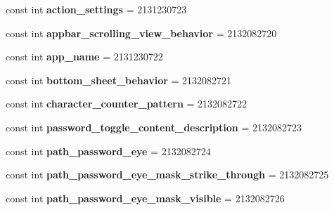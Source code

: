 \begin{DoxyCompactItemize}
const int {\bfseries action\+\_\+settings} = 2131230723
\item 
\mbox{\label{classst_delivery_1_1_resource_1_1_string_a73f4427fdcf138c5f5541f31e81d44af}} 
const int {\bfseries appbar\+\_\+scrolling\+\_\+view\+\_\+behavior} = 2132082720
\item 
\mbox{\label{classst_delivery_1_1_resource_1_1_string_a10df4decdb3e0caa6e07b4a53aa7854d}} 
const int {\bfseries app\+\_\+name} = 2131230722
\item 
\mbox{\label{classst_delivery_1_1_resource_1_1_string_a4cc6f335cbbd3ac409c22aaf3b35bff6}} 
const int {\bfseries bottom\+\_\+sheet\+\_\+behavior} = 2132082721
\item 
\mbox{\label{classst_delivery_1_1_resource_1_1_string_ace87198cd1e907f2593d1e944fc8f258}} 
const int {\bfseries character\+\_\+counter\+\_\+pattern} = 2132082722
\item 
\mbox{\label{classst_delivery_1_1_resource_1_1_string_ad8a3afa0186c3565e08b9b0e0f7b1868}} 
const int {\bfseries password\+\_\+toggle\+\_\+content\+\_\+description} = 2132082723
\item 
\mbox{\label{classst_delivery_1_1_resource_1_1_string_a7491fb216ff4d34fc8372e8d42132615}} 
const int {\bfseries path\+\_\+password\+\_\+eye} = 2132082724
\item 
\mbox{\label{classst_delivery_1_1_resource_1_1_string_a26774a0a2a44ce141c6c2bcba3487168}} 
const int {\bfseries path\+\_\+password\+\_\+eye\+\_\+mask\+\_\+strike\+\_\+through} = 2132082725
\item 
\mbox{\label{classst_delivery_1_1_resource_1_1_string_ae9f104d8ecf6524652921d9e755ab042}} 
const int {\bfseries path\+\_\+password\+\_\+eye\+\_\+mask\+\_\+visible} = 2132082726
\item 
\mbox{\label{classst_delivery_1_1_resource_1_1_string_a6cd7ed8eedb95e513704f9b348abba30}} 

\end{DoxyCompactItemize}

